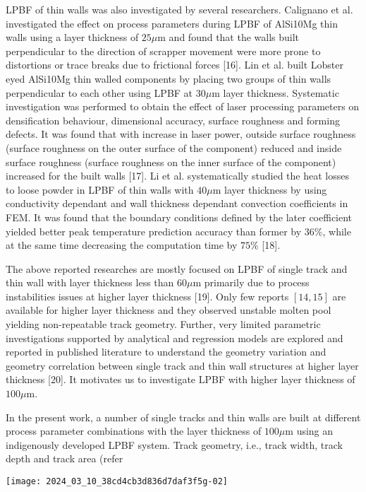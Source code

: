 \documentclass[10pt]{article}
\begin{document}
LPBF of thin walls was also investigated by several researchers. Calignano et al. investigated the effect on process parameters during LPBF of AlSi10Mg thin walls using a layer thickness of $25 \mu \mathrm{m}$ and found that the walls built perpendicular to the direction of scrapper movement were more prone to distortions or trace breaks due to frictional forces [16]. Lin et al. built Lobster eyed AlSi10Mg thin walled components by placing two groups of thin walls perpendicular to each other using LPBF at $30 \mu \mathrm{m}$ layer thickness. Systematic investigation was performed to obtain the effect of laser processing parameters on densification behaviour, dimensional accuracy, surface roughness and forming defects. It was found that with increase in laser power, outside surface roughness (surface roughness on the outer surface of the component) reduced and inside surface roughness (surface roughness on the inner surface of the component) increased for the built walls [17]. Li et al. systematically studied the heat losses to loose powder in LPBF of thin walls with $40 \mu \mathrm{m}$ layer thickness by using conductivity dependant and wall thickness dependant convection coefficients in FEM. It was found that the boundary conditions defined by the later coefficient yielded better peak temperature prediction accuracy than former by $36 \%$, while at the same time decreasing the computation time by $75 \%$ [18].

The above reported researches are mostly focused on LPBF of single track and thin wall with layer thickness less than $60 \mu \mathrm{m}$ primarily due to process instabilities issues at higher layer thickness [19]. Only few reports $[14,15]$ are available for higher layer thickness and they observed unstable molten pool yielding non-repeatable track geometry. Further, very limited parametric investigations supported by analytical and regression models are explored and reported in published literature to understand the geometry variation and geometry correlation between single track and thin wall structures at higher layer thickness [20]. It motivates us to investigate LPBF with higher layer thickness of $100 \mu \mathrm{m}$.

In the present work, a number of single tracks and thin walls are built at different process parameter combinations with the layer thickness of $100 \mu \mathrm{m}$ using an indigenously developed LPBF system. Track geometry, i.e., track width, track depth and track area (refer

\begin{center}
\texttt{[image: 2024\_03\_10\_38cd4cb3d836d7daf3f5g-02]}
\end{center}
\end{document}
